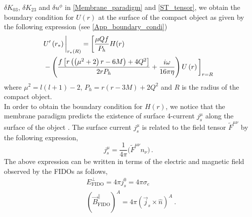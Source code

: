 \documentclass[aps,prd,twocolumn,floatfix,noshowpacs,tightenlines,noshowkeys,superscriptaddress,amsmath,amssymb,
nofootinbib]{revtex4-1}
\renewcommand\[{\begin{equation}}
\renewcommand\]{\end{equation}}
\begin{document}
$\delta K_{03}$, $\delta K_{23}$ and $\delta u^\phi$ in \autoref{Membrane_paradigm} and \autoref{ST_tensor}, we obtain the boundary condition for $U(r)$ at the surface of the compact object as given by the following expression (see \autoref{App_boundary_condi})
\begin{equation}\label{grav_pert}
\begin{aligned}
&U'\left(r_*\right)\bigg{|}_{r_*(R)}=\bigg[\frac{\mu  Q f }{P_h}H(r)\\&-\left(\frac{f \left[r \left(\left(\mu ^2+2\right) r-6 M\right)+4 Q^2\right]}{2 r P_h}+\frac{i \omega }{16 \pi  \eta }\right)U\left(r\right)\bigg]_{r=R}
\end{aligned}
\end{equation}
where $\mu^2=l(l+1)-2$, $P_h=r (r-3 M)+2 Q^2$ and $R$ is the radius of the compact object. \\
 In order to obtain the boundary condition for $H(r)$, we notice that the membrane paradigm predicts the existence of surface 4-current $j^{\mu}_s$ along the surface of the object \cite{Thorne, PhysRevD.58.064011}. The surface current $j^{\mu}_s$ is related to the field tensor $\tilde{F}^{\mu\nu}$ by the following expression,
\begin{equation}
j^{\mu}_{s}=\frac{1}{4\pi}\bigg(\tilde{F}^{\mu\nu}n_{\nu}\bigg)\,.\label{surface_current}    
\end{equation}
The above expression can be written in terms of the electric and magnetic field observed by the FIDOs as follows,
\begin{equation}\label{surface_EM_field}
\begin{aligned}
	&{E}^\bot_{\textrm{FIDO}}={4\pi j^{0}_s}=4\pi \sigma_{e} \\&(\vec{B}^\parallel_{\textrm{FIDO}})^A=4\pi (\vec{j}_s\times \hat{n})^{A}~.
\end{aligned}
\end{equation}
\end{document}
